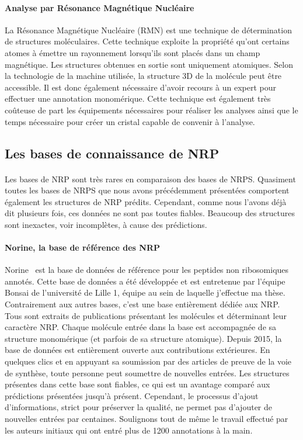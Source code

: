 \documentclass[12pt,french,twoside]{report}
\begin{document}
\paragraph{Analyse par Résonance Magnétique Nucléaire}
La Résonance Magnétique Nucléaire (RMN) est une technique de détermination de structures moléculaires.
Cette technique exploite la propriété qu'ont certains atomes à émettre un rayonnement lorsqu'ils sont placés dans un champ magnétique.
Les structures obtenues en sortie sont uniquement atomiques.
Selon la technologie de la machine utilisée, la structure 3D de la molécule peut être accessible.
Il est donc également nécessaire d'avoir recours à un expert pour effectuer une annotation monomérique.
Cette technique est également très coûteuse de part les équipements nécessaires pour réaliser les analyses ainsi que le temps nécessaire pour créer un cristal capable de convenir à l'analyse.



\subsection{Les bases de connaissance de NRP}

\label{bdd_nrp}

\paragraph{}Les bases de NRP sont très rares en comparaison des bases de NRPS.
Quasiment toutes les bases de NRPS que nous avons précédemment présentées comportent également les structures de NRP prédits.
Cependant, comme nous l'avons déjà dit plusieurs fois, ces données ne sont pas toutes fiables.
Beaucoup des structures sont inexactes, voir incomplètes, à cause des prédictions.

\paragraph{Norine, la base de référence des NRP}
Norine~\cite{caboche_norine:_2008} est la base de données de référence pour les peptides non ribosomiques annotés.
Cette base de données a été développée et est entretenue par l'équipe Bonsai de l'université de Lille 1, équipe au sein de laquelle j'effectue ma thèse.
Contrairement aux autres bases, c'est une base entièrement dédiée aux NRP.
Tous sont extraits de publications présentant les molécules et déterminant leur caractère NRP.
Chaque molécule entrée dans la base est accompagnée de sa structure monomérique (et parfois de sa structure atomique).
Depuis 2015, la base de données est entièrement ouverte aux contributions extérieures.
En quelques clics et en appuyant sa soumission par des articles de preuve de la voie de synthèse, toute personne peut soumettre de nouvelles entrées.
Les structures présentes dans cette base sont fiables, ce qui est un avantage comparé aux prédictions présentées jusqu'à présent.
Cependant, le processus d'ajout d'informations, strict pour préserver la qualité, ne permet pas d'ajouter de nouvelles entrées par centaines.
Soulignons tout de même le travail effectué par les auteurs initiaux qui ont entré plus de 1200 annotations à la main.
\end{document}
